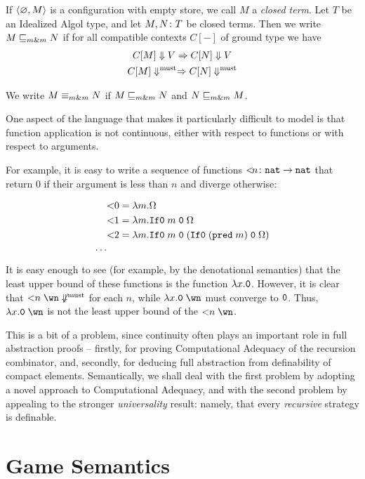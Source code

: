 \documentclass[sigplan,10pt,review]{acmart}\settopmatter{printfolios=true,printccs=false,printacmref=false}
\begin{document}
If $\langle \varnothing , M \rangle$ is a configuration with empty store, we call $M$ a \emph{closed term}.  
Let $T$ be an Idealized Algol type, and let $M,N\colon T$ be closed terms.
Then we write $M\sqsubseteq_{m\&m} N$ if for all compatible contexts $C[-]$ of ground type we have
\begin{gather*}
  C[M]\Downarrow V \Rightarrow C[N] \Downarrow V\\
  C[M]\Downarrow^{\text{must}} \Rightarrow C[N] \Downarrow^{\text{must}}
\end{gather*}

We write $M\equiv_{m\&m} N$ if $M\sqsubseteq_{m\&m} N$ and $N\sqsubseteq_{m\&m} M$.

One aspect of the language that makes it particularly difficult to model is that function application is not continuous, either with respect to functions or with respect to arguments.  

For example, it is easy to write a sequence of functions ${<}\!n \colon {\mathtt{nat}} \to {\mathtt{nat}}$ that return $0$ if their argument is less than $n$ and diverge otherwise:

\begin{align*}
  &{<}0 = \lambda m.\Omega \\
  &{<}1 = \lambda m.{\mathtt{If0}\;} m\;{\mathtt{0}}\;\Omega \\
  &{<}2 = \lambda m.{\mathtt{If0}\;} m\;{\mathtt{0}}\;({\mathtt{If0}\;} ({\mathtt{pred\;}} m)\;{\mathtt{0}}\;\Omega)\\
  \cdots
\end{align*}
It is easy enough to see (for example, by the denotational semantics) that the least upper bound of these functions is the function $\lambda x.{\mathtt{0}}$.  
However, it is clear that ${<}n\;\wn\not\mustconverge$ for each $n$, while $\lambda x.\0\;\wn$ must converge to ${\mathtt{0}}$.  
Thus, $\lambda x.\0\;\wn$ is not the least upper bound of the ${<}n\;\wn$.

This is a bit of a problem, since continuity often plays an important role in full abstraction proofs -- firstly, for proving Computational Adequacy of the recursion combinator, and, secondly, for deducing full abstraction from definability of compact elements.
Semantically, we shall deal with the first problem by adopting a novel approach to Computational Adequacy, and with the second problem by appealing to the stronger \emph{universality} result: namely, that every \emph{recursive} strategy is definable.

\section{Game Semantics}
\end{document}
